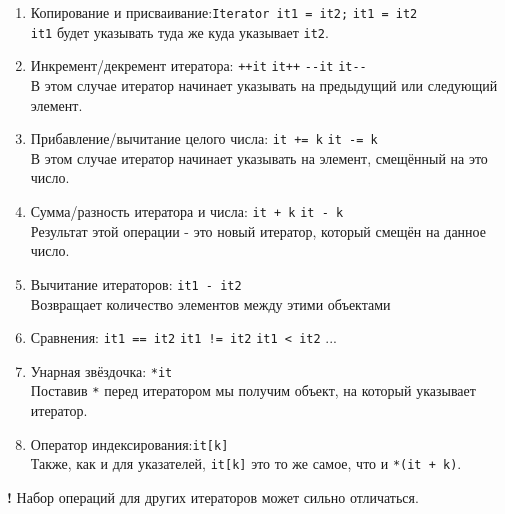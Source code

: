 \documentclass{article}
\begin{document}
\begin{enumerate}
\item Копирование и присваивание:\quad \texttt{Iterator it1 = it2;} \quad \texttt{it1 = it2}\\
\texttt{it1} будет указывать туда же куда указывает \texttt{it2}.
\item Инкремент/декремент итератора: \quad \texttt{++it} \quad \texttt{it++} \quad \texttt{-{}-it} \quad \texttt{it-{}-}\\
В этом случае итератор начинает указывать на предыдущий или следующий элемент.
\item Прибавление/вычитание целого числа: \quad \texttt{it += k} \quad \texttt{it -= k}\\
В этом случае итератор начинает указывать на элемент, смещённый на это число.
\item Сумма/разность итератора и числа: \quad \texttt{it + k} \quad \texttt{it - k}\\
Результат этой операции - это новый итератор, который смещён на данное число.
\item Вычитание итераторов: \quad \texttt{it1 - it2}\\
Возвращает количество элементов между этими объектами
\item Сравнения:  \quad\texttt{it1 == it2} \quad  \texttt{it1 != it2} \quad  \texttt{it1 < it2} \quad  ...
\item Унарная звёздочка: \quad \texttt{*it}\\
Поставив \texttt{*} перед итератором мы получим объект, на который указывает итератор.
\item Оператор индексирования:\quad \texttt{it[k]}\\
Также, как и для указателей, \texttt{it[k]} это то же самое, что и \texttt{*(it + k)}.
\end{enumerate}     
\textbf{!} Набор операций для других итераторов может сильно отличаться.  

\newpage
\end{document}
